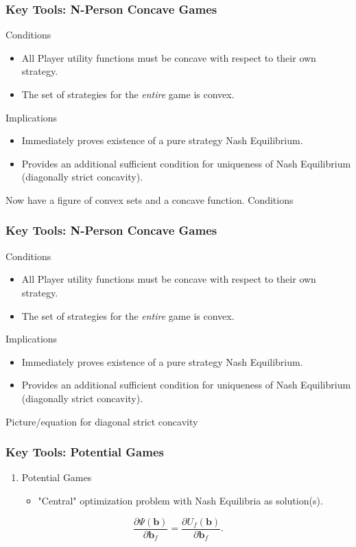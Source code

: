\documentclass[10pt,tgadventor, onlymath]{beamer}
\begin{document}
\begin{frame}
\frametitle{Key Tools: N-Person Concave Games}
Conditions
\begin{itemize}
\item All Player utility functions must be concave with respect to their own strategy.
\item The set of strategies for the \emph{entire} game is convex. 
\end{itemize}
Implications
\begin{itemize}
\item Immediately proves existence of a pure strategy Nash Equilibrium.
\item Provides an additional sufficient condition for uniqueness of Nash Equilibrium (diagonally strict concavity).
\end{itemize}
Now have a figure of convex sets and a concave function. 
Conditions
\end{frame}


\begin{frame}
\frametitle{Key Tools: N-Person Concave Games}
Conditions
\begin{itemize}
\item All Player utility functions must be concave with respect to their own strategy.
\item The set of strategies for the \emph{entire} game is convex. 
\end{itemize}
Implications
\begin{itemize}
\item Immediately proves existence of a pure strategy Nash Equilibrium.
\item Provides an additional sufficient condition for uniqueness of Nash Equilibrium (diagonally strict concavity).
\end{itemize}
Picture/equation for diagonal strict concavity
\end{frame}


\begin{frame}
\frametitle{Key Tools: Potential Games}
\begin{enumerate}
\item 
Potential Games
\begin{itemize}
\item "Central" optimization problem with Nash Equilibria as solution(s).
\end{itemize}
\end{enumerate}

\begin{equation}\label{potential_game_condition}
\frac{\partial \Psi(\mathbf{b})}{\partial \mathbf{b}_{f}}
 =
 \frac{\partial U_f(\mathbf{b})}{\partial \mathbf{b}_{f}}.
\end{equation} 
\end{frame}
\end{document}
